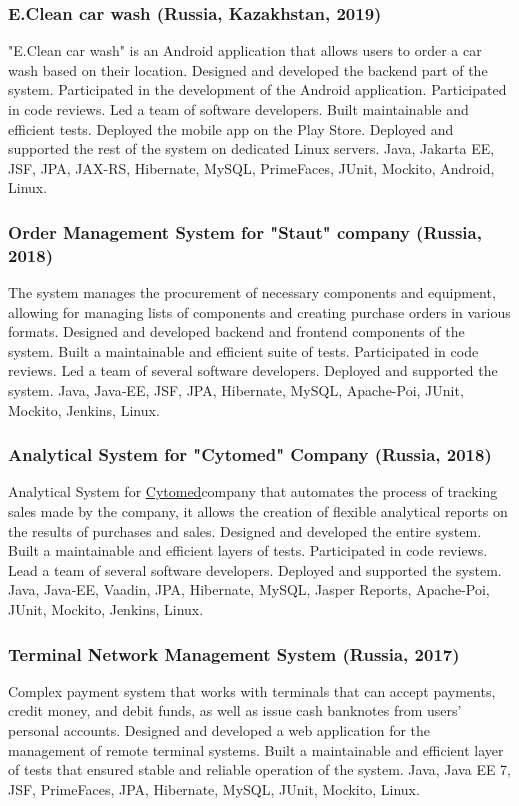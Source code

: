 \documentclass{vl}
\begin{document}
    \subsubsection*{E.Clean car wash (Russia, Kazakhstan, 2019)}
    "E.Clean car wash" is an Android application
    that allows users to order a car wash based on their location.
    Designed and developed the backend part of the system.
    Participated in the development of the Android application.
    Participated in code reviews.
    Led a team of software developers.
    Built maintainable and efficient tests.
    Deployed the mobile app on the Play Store.
    Deployed and supported the rest of the system on dedicated Linux servers.
    Java, Jakarta EE, JSF, JPA, JAX-RS, Hibernate, MySQL, PrimeFaces, JUnit, Mockito, Android, Linux.

    \subsubsection*{Order Management System for "Staut" company (Russia, 2018)}
    The system manages the procurement of necessary components and equipment,
    allowing for managing lists of components and creating purchase orders in various formats.
    Designed and developed backend and frontend components of the system.
    Built a maintainable and efficient suite of tests.
    Participated in code reviews.
    Led a team of several software developers.
    Deployed and supported the system.
    Java, Java‐EE, JSF, JPA, Hibernate, MySQL, Apache-Poi, JUnit, Mockito, Jenkins, Linux.

    \subsubsection*{Analytical System for "Cytomed" Company (Russia, 2018)}
    Analytical System for \href{https://cytomed.ru/en/}{Cytomed}company that automates the process of tracking sales
    made by the company, it allows the creation of flexible analytical reports on the results of purchases and sales.
    Designed and developed the entire system.
    Built a maintainable and efficient layers of tests.
    Participated in code reviews.
    Lead a team of several software developers.
    Deployed and supported the system.
    Java, Java‐EE, Vaadin, JPA, Hibernate, MySQL, Jasper Reports, Apache-Poi, JUnit, Mockito, Jenkins, Linux.

    \subsubsection*{Terminal Network Management System (Russia, 2017)}
    Complex payment system that works with terminals that can accept payments, credit money, and debit funds,
    as well as issue cash banknotes from users' personal accounts.
    Designed and developed a web application for the management of remote terminal systems.
    Built a maintainable and efficient layer of tests that ensured stable and reliable operation of the system.
    Java, Java EE 7, JSF, PrimeFaces, JPA, Hibernate, MySQL, JUnit, Mockito, Linux.
\end{document}
